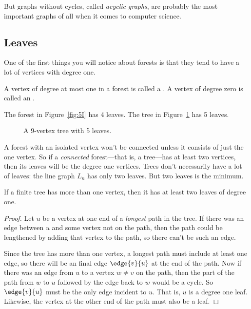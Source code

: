 But graphs without cycles, called \emph{acyclic graphs}, are
probably the most important graphs of all when it comes to computer
science.\fi

\subsection{Leaves}

One of the first things you will notice about forests is that they
tend to have a lot of vertices with degree one.
\begin{definition}
A vertex of degree at most one in a forest is called a .  A
vertex of degree zero is called an .
\end{definition}
The forest in Figure~\ref{fig:5I} has 4 leaves.  The tree in
Figure~\ref{fig:5H} has 5 leaves.

\begin{figure}
\caption{A 9-vertex tree with 5 leaves.}
\label{fig:5H}
\end{figure}

A forest with an isolated vertex won't be connected unless it consists
of just the one vertex.  So if a \emph{connected} forest---that is, a
tree---has at least two vertices, then its leaves will be the degree
one vertices.  Trees don't necessarily have a lot of leaves: the line
graph $L_n$ has only two leaves.  But two leaves is the minimum.

\begin{lemma}\label{lem:2leaves}
If a finite tree has more than one vertex, then it has at least two
leaves of degree one.

\begin{proof}
  Let $u$ be a vertex at one end of a \emph{longest} path in the tree.
  If there was an edge between $u$ and some vertex
  not on the path, then the path could be lengthened by adding that
  vertex to the path, so there can't be such an edge.  

  Since the tree has more than one vertex, a longest path must include
  at least one edge, so there will be an final edge $\edge{v}{u}$ at
  the end of the path.  Now if there was an edge from $u$ to a vertex
  $w \neq v$ on the path, then the part of the path from $w$ to $u$
  followed by the edge back to $w$ would be a cycle.  So $\edge{v}{u}$
  must be the only edge incident to $u$.  That is, $u$ is a degree one
  leaf.  Likewise, the vertex at the other end of the path must also
  be a leaf.
\end{proof}
\end{lemma}


